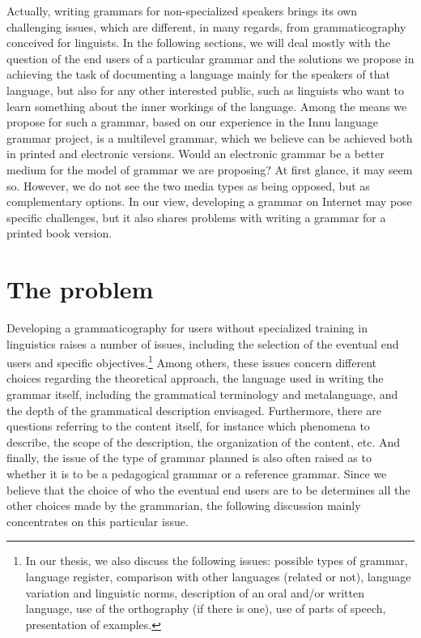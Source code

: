 Actually, writing grammars for non-specialized speakers brings its own challenging issues, which are different, in many regards, from grammaticography conceived for linguists. In the following sections, we will deal mostly with the question of the end users of a particular grammar and the solutions we propose in achieving the task of documenting a language mainly for the speakers of that language, but also for any other interested public, such as linguists who want to learn something about the inner workings of the language. Among the means we propose for such a grammar, based on our experience in the Innu language grammar project, is a multilevel grammar, which we believe can be achieved both in printed and electronic versions. Would an electronic grammar be a better medium for the model of grammar we are proposing? At first glance, it may seem so. However, we do not see the two media types as being opposed, but as complementary options. In our view, developing a grammar on Internet may pose specific challenges, but it also shares problems with writing a grammar for a printed book version.

\section{The problem} Developing a grammaticography for users without specialized training in linguistics raises a number of issues, including the selection of the eventual end users and specific objectives.\footnote{In
 our thesis, we also discuss the following issues: possible types of grammar, language register, compari\-son with other languages (related or not), language variation and linguistic norms, description of an oral and/or written language, use of the orthography (if there is one), use of parts of speech, presentation of examples.
}
Among others, these issues concern different choices regarding the theoretical approach, the language used in writing the grammar itself, including the grammatical terminology and metalanguage, and the depth of the grammatical description envisaged. Furthermore, there are questions referring to the content itself, for instance which phenomena to describe, the scope of the description, the organization of the content, etc. And finally, the issue of the type of grammar planned is also often raised as to whether it is to be a pedagogical grammar or a reference grammar. 
Since we believe that the choice of who the eventual end users are to be determines all the other choices made by the grammarian, the following discussion mainly concentrates on this particular issue. 

